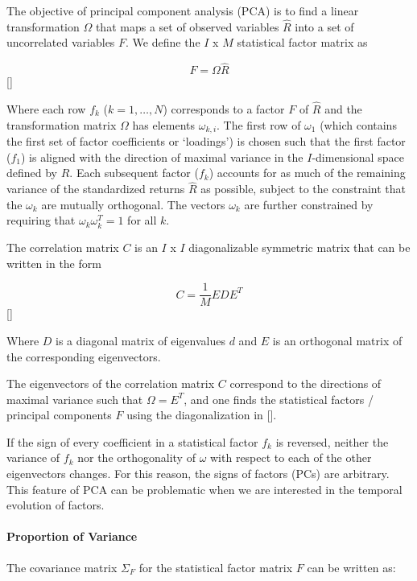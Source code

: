 \documentclass[]{article}
\begin{document}
The objective of principal component analysis (PCA) is to find a linear
transformation \(\Omega\) that maps a set of observed variables
\(\hat{R}\) into a set of uncorrelated variables \(F\). We define the
\(I\) x \(M\) statistical factor matrix as

\[F = \Omega\hat{R}\] {[}{]}

Where each row \(f_{k}\) (\(k = 1, \dots ,N\)) corresponds to a factor
\(F\) of \(\hat{R}\) and the transformation matrix \(\Omega\) has
elements \(\omega_{k,i}\). The first row of \(\omega_{1}\) (which
contains the first set of factor coefficients or `loadings') is chosen
such that the first factor (\(f_{1}\)) is aligned with the direction of
maximal variance in the \(I\)-dimensional space defined by \(\hat{R}\).
Each subsequent factor (\(f_{k}\)) accounts for as much of the remaining
variance of the standardized returns \(\hat{R}\) as possible, subject to
the constraint that the \(\omega_{k}\) are mutually orthogonal. The
vectors \(\omega_{k}\) are further constrained by requiring that
\(\omega_{k}\omega_{k}^{T}=1\) for all \(k\).

The correlation matrix \(C\) is an \(I\) x \(I\) diagonalizable
symmetric matrix that can be written in the form

\[C = \frac{1}{M}EDE^{T}\] {[}{]}

Where \(D\) is a diagonal matrix of eigenvalues \(d\) and \(E\) is an
orthogonal matrix of the corresponding eigenvectors.

The eigenvectors of the correlation matrix \(C\) correspond to the
directions of maximal variance such that \(\Omega=E^{T}\), and one finds
the statistical factors / principal components \(F\) using the
diagonalization in {[}{]}.

If the sign of every coefficient in a statistical factor \(f_{k}\) is
reversed, neither the variance of \(f_{k}\) nor the orthogonality of
\(\omega\) with respect to each of the other eigenvectors changes. For
this reason, the signs of factors (PCs) are arbitrary. This feature of
PCA can be problematic when we are interested in the temporal evolution
of factors.

\paragraph{Proportion of Variance}\label{proportion-of-variance}

The covariance matrix \(\Sigma_{F}\) for the statistical factor matrix
\(F\) can be written as:
\end{document}

